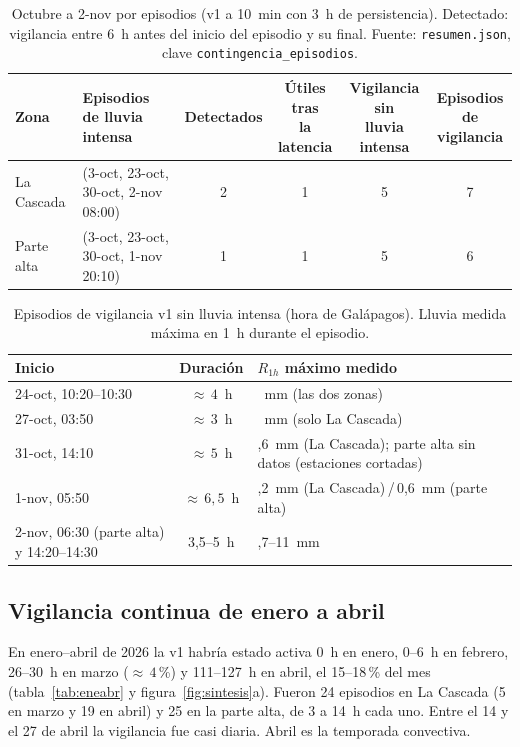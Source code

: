 \documentclass{sosg-informe}
\begin{document}
\begin{table}[ht]
  \centering\small
  \caption{Octubre a 2-nov por episodios (v1 a 10~min con 3~h de persistencia). Detectado: vigilancia entre 6~h antes del inicio del episodio y su final. Fuente: \texttt{resumen.json}, clave \texttt{contingencia\_episodios}.}
  \label{tab:episodios}
  \begin{tabularx}{\linewidth}{l>{\raggedright\arraybackslash}Xcccc}
    \toprule
    Zona & Episodios de lluvia intensa & Detectados & \makecell{Útiles tras\\la latencia} & \makecell{Vigilancia sin\\lluvia intensa} & \makecell{Episodios de\\vigilancia} \\
    \midrule
    La Cascada & 4 (3-oct, 23-oct, 30-oct, 2-nov 08:00) & 2 & 1 & 5 & 7 \\
    Parte alta & 4 (3-oct, 23-oct, 30-oct, 1-nov 20:10) & 1 & 1 & 5 & 6 \\
    \bottomrule
  \end{tabularx}
\end{table}

\begin{table}[ht]
  \centering\small
  \caption{Episodios de vigilancia v1 sin lluvia intensa (hora de Galápagos). Lluvia medida máxima en 1~h durante el episodio.}
  \label{tab:falsas}
  \begin{tabularx}{\linewidth}{lc>{\raggedright\arraybackslash}X}
    \toprule
    Inicio & Duración & $R_{1h}$ máximo medido \\
    \midrule
    24-oct, 10:20--10:30 & ${\approx}\,4$~h & 0~mm (las dos zonas) \\
    27-oct, 03:50 & ${\approx}\,3$~h & 0~mm (solo La Cascada) \\
    31-oct, 14:10 & ${\approx}\,5$~h & 7,6~mm (La Cascada); parte alta sin datos (estaciones cortadas) \\
    1-nov, 05:50 & ${\approx}\,6,5$~h & 7,2~mm (La Cascada)\,/\,0,6~mm (parte alta) \\
    2-nov, 06:30 (parte alta) y 14:20--14:30 & 3,5--5~h & 6,7--11~mm \\
    \bottomrule
  \end{tabularx}
\end{table}

\subsection{Vigilancia continua de enero a abril}
En enero--abril de 2026 la v1 habría estado activa 0~h en enero, 0--6~h en febrero, 26--30~h en marzo (${\approx}\,4$\,\%) y 111--127~h en abril, el 15--18\,\% del mes (tabla~\ref{tab:eneabr} y figura~\ref{fig:sintesis}a). Fueron 24 episodios en La Cascada (5 en marzo y 19 en abril) y 25 en la parte alta, de 3 a 14~h cada uno. Entre el 14 y el 27 de abril la vigilancia fue casi diaria. Abril es la temporada convectiva.
\end{document}
